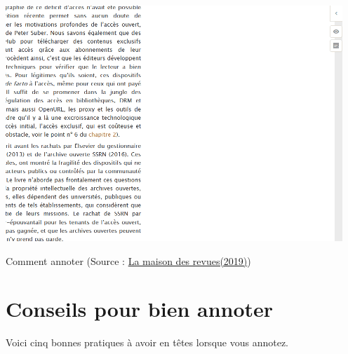 \documentclass[
]{book}
\begin{document}
\includegraphics{img/img-5.gif}

Comment annoter (Source : \href{http://www.maisondesrevues.org/1182}{La maison des revues(2019)})

\hypertarget{s31}{%
\section{Conseils pour bien annoter}\label{s31}}

Voici cinq bonnes pratiques à avoir en têtes lorsque vous annotez.
\end{document}
